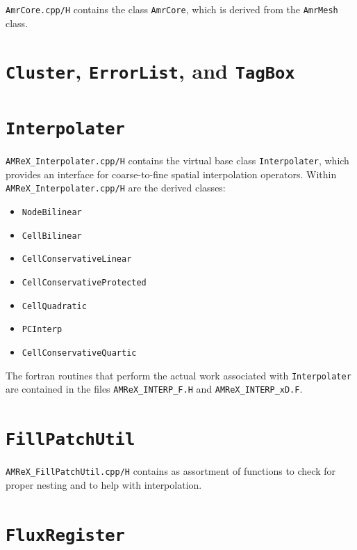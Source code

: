 {\tt AmrCore.cpp/H} contains the class {\tt AmrCore}, which is derived from
the {\tt AmrMesh} class.

\section{{\tt Cluster}, {\tt ErrorList}, and {\tt TagBox}}

\section{{\tt Interpolater}}

{\tt AMReX\_Interpolater.cpp/H} contains the virtual base class {\tt Interpolater}, which provides
an interface for coarse-to-fine spatial interpolation operators.  Within {\tt AMReX\_Interpolater.cpp/H}
are the derived classes:
\begin{itemize}
\item {\tt NodeBilinear}
\item {\tt CellBilinear}
\item {\tt CellConservativeLinear}
\item {\tt CellConservativeProtected}
\item {\tt CellQuadratic}
\item {\tt PCInterp}
\item {\tt CellConservativeQuartic}
\end{itemize}
The fortran routines that perform the actual work associated with {\tt Interpolater} are 
contained in the files {\tt AMReX\_INTERP\_F.H} and {\tt AMReX\_INTERP\_xD.F}.

\section{{\tt FillPatchUtil}}
\label{sec:amrcore:fillpatch}

{\tt AMReX\_FillPatchUtil.cpp/H} contains as assortment of functions to check for proper nesting
and to help with interpolation.

\section{{\tt FluxRegister}}


